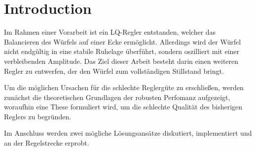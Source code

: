 \ifx\FORMAT\undefined


\fi

\chapter{Introduction}
Im Rahmen einer Vorarbeit ist ein LQ-Regler entstanden, welcher das Balancieren des Würfels auf einer Ecke ermöglicht. Allerdings wird der Würfel nicht endgültig in eine stabile Ruhelage überführt, sondern oszilliert mit einer verbleibenden Amplitude. Das Ziel dieser Arbeit besteht darin einen weiteren Regler zu entwerfen, der den Würfel zum vollständigen Stillstand bringt. 

Um die möglichen Ursachen für die schlechte Reglergüte zu erschließen, werden zunächst die theoretischen Grundlagen der robusten Perfomanz aufgezeigt, woraufhin eine These formuliert wird, um die schlechte Qualität des bisherigen Reglers zu begründen.

Im Anschluss werden zwei mögliche Lösungsansätze diskutiert, implementiert und an der Regelstrecke erprobt. 


\ifx\FORMAT\undefined

\fi